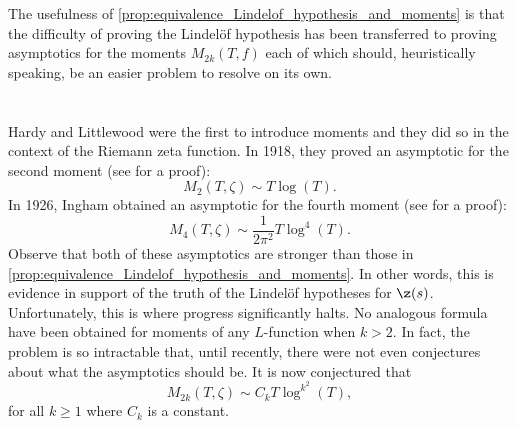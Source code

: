   The usefulness of \cref{prop:equivalence_Lindelof_hypothesis_and_moments} is that the difficulty of proving the Lindel\"of hypothesis has been transferred to proving asymptotics for the moments $M_{2k}(T,f)$ each of which should, heuristically speaking, be an easier problem to resolve on its own.
\section{}
  Hardy and Littlewood were the first to introduce moments and they did so in the context of the Riemann zeta function. In 1918, they proved an asymptotic for the second moment (see \cite{hardy1916contributions} for a proof):
  \[
    M_{2}(T,\zeta) \sim T\log(T).
  \]
  In 1926, Ingham obtained an asymptotic for the fourth moment (see \cite{ingham1928mean} for a proof):
  \[
    M_{4}(T,\zeta) \sim \frac{1}{2\pi^{2}}T\log^{4}(T).
  \]
  Observe that both of these asymptotics are stronger than those in \cref{prop:equivalence_Lindelof_hypothesis_and_moments}. In other words, this is evidence in support of the truth of the Lindel\"of hypotheses for $\z(s)$. Unfortunately, this is where progress significantly halts. No analogous formula have been obtained for moments of any $L$-function when $k > 2$. In fact, the problem is so intractable that, until recently, there were not even conjectures about what the asymptotics should be. It is now conjectured that
  \[
    M_{2k}(T,\zeta) \sim C_{k}T\log^{k^{2}}(T),
  \]
  for all $k \ge 1$ where $C_{k}$ is a constant.